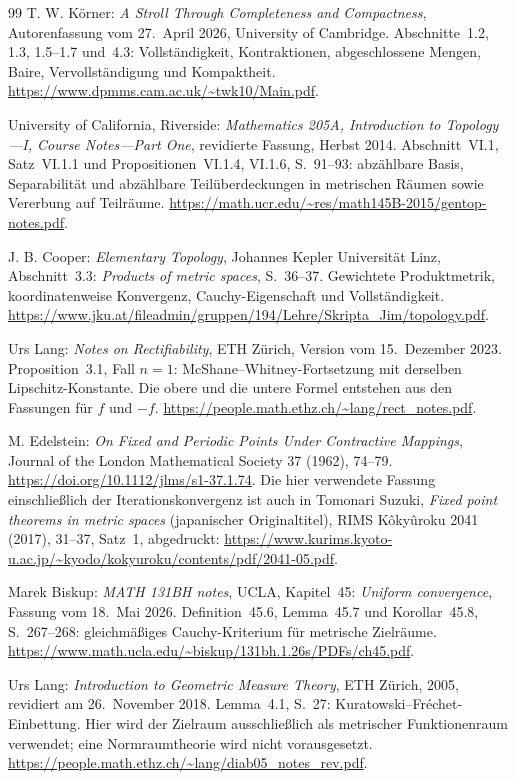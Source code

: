 \begin{thebibliography}{99}
T. W. Körner: \emph{A Stroll Through Completeness and Compactness},
Autorenfassung vom 27.~April 2026, University of Cambridge.
Abschnitte~1.2, 1.3, 1.5--1.7 und~4.3:
Vollständigkeit, Kontraktionen, abgeschlossene Mengen, Baire,
Vervollständigung und Kompaktheit.
\url{https://www.dpmms.cam.ac.uk/~twk10/Main.pdf}.

University of California, Riverside:
\emph{Mathematics 205A, Introduction to Topology---I, Course Notes---Part One},
revidierte Fassung, Herbst 2014.
Abschnitt~VI.1, Satz~VI.1.1 und Propositionen~VI.1.4, VI.1.6,
S.~91--93: abzählbare Basis, Separabilität und abzählbare Teilüberdeckungen
in metrischen Räumen sowie Vererbung auf Teilräume.
\url{https://math.ucr.edu/~res/math145B-2015/gentop-notes.pdf}.

J. B. Cooper: \emph{Elementary Topology},
Johannes Kepler Universität Linz, Abschnitt~3.3:
\emph{Products of metric spaces}, S.~36--37.
Gewichtete Produktmetrik, koordinatenweise Konvergenz,
Cauchy-Eigenschaft und Vollständigkeit.
\url{https://www.jku.at/fileadmin/gruppen/194/Lehre/Skripta_Jim/topology.pdf}.

Urs Lang: \emph{Notes on Rectifiability}, ETH Zürich,
Version vom 15.~Dezember 2023.
Proposition~3.1, Fall $n=1$: McShane--Whitney-Fortsetzung mit derselben
Lipschitz-Konstante. Die obere und die untere Formel entstehen aus den
Fassungen für $f$ und $-f$.
\url{https://people.math.ethz.ch/~lang/rect_notes.pdf}.

M. Edelstein: \emph{On Fixed and Periodic Points Under Contractive Mappings},
Journal of the London Mathematical Society 37 (1962), 74--79.
\url{https://doi.org/10.1112/jlms/s1-37.1.74}.
Die hier verwendete Fassung einschließlich der Iterationskonvergenz ist
auch in Tomonari Suzuki, \emph{Fixed point theorems in metric spaces}
(japanischer Originaltitel), RIMS K\^oky\^uroku 2041 (2017), 31--37,
Satz~1, abgedruckt:
\url{https://www.kurims.kyoto-u.ac.jp/~kyodo/kokyuroku/contents/pdf/2041-05.pdf}.

Marek Biskup: \emph{MATH 131BH notes}, UCLA, Kapitel~45:
\emph{Uniform convergence}, Fassung vom 18.~Mai 2026.
Definition~45.6, Lemma~45.7 und Korollar~45.8, S.~267--268:
gleichmäßiges Cauchy-Kriterium für metrische Zielräume.
\url{https://www.math.ucla.edu/~biskup/131bh.1.26s/PDFs/ch45.pdf}.

Urs Lang: \emph{Introduction to Geometric Measure Theory},
ETH Zürich, 2005, revidiert am 26.~November 2018.
Lemma~4.1, S.~27: Kuratowski--Fréchet-Einbettung.
Hier wird der Zielraum ausschließlich als metrischer Funktionenraum
verwendet; eine Normraumtheorie wird nicht vorausgesetzt.
\url{https://people.math.ethz.ch/~lang/diab05_notes_rev.pdf}.


\end{thebibliography}

